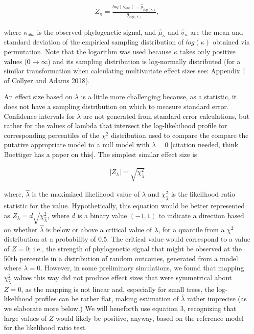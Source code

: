 \documentclass[
]{article}
\begin{document}
{\begin{align}
    Z_\kappa=\frac{log(\kappa_{obs})-\hat\mu_{log(\kappa)}}{\hat\sigma_{log(\kappa)}},
\end{align}

where \(\kappa_{obs}\) is the observed phylogenetic signal, and
\(\hat\mu_\kappa\) and \(\hat\sigma_\kappa\) are the mean and standard
deviation of the empirical sampling distribution of \(log(\kappa)\)
obtained via permutation. Note that the logarithm was used because
\(\kappa\) takes only positive values (\(0\to\infty\)) and its sampling
distribution is log-normally distributed (for a similar transformation
when calculating multivariate effect sizes see: Appendix 1 of Collyer
and Adams 2018). \hfill\break

An effect size based on \(\lambda\) is a little more challenging
because, as a statistic, it does not have a sampling distribution on
which to measure standard error. Confidence intervals for \(\lambda\)
are not generated from standard error calculations, but rather for the
values of lambda that intersect the log-likehihood profile for
corresponding percentiles of the \(\chi^2\) distribution used to compare
the compare the putative appropriate model to a null model with
\(\lambda = 0\) {[}citation needed, think Boettiger has a paper on
this{]}. The simplest similar effect size is

\begin{align}
   \lvert Z_{\lambda} \rvert = \sqrt{\chi^2_{\hat{\lambda}}}
\end{align}

where, \(\hat{\lambda}\) is the maximized likelihood value of
\(\lambda\) and \(\chi^{2}_{\hat{\lambda}}\) is the likelihood ratio
statistic for the value. Hypothetically, this equation would be better
represented as \(Z_{\lambda} = d \sqrt{\chi^2_{\hat{\lambda}}}\), where
\(d\) is a binary value \((-1,1)\) to indicate a direction based on
whether \(\hat{\lambda}\) is below or above a critical value of
\(\lambda\), for a quantile from a \(\chi^{2}\) distribution at a
probability of 0.5. The critical value would correspond to a value of
\(Z = 0\); i.e., the strength of phylogenetic signal that might be
observed at the 50th percentile in a distribution of random outcomes,
generated from a model where \(\lambda = 0\). However, in some
preliminary simulations, we found that mapping
\(\chi^2_{\hat{\lambda}}\) values this way did not produce effect sizes
that were symmetrical about \(Z = 0\), as the mapping is not linear and,
especially for small trees, the log-likelihood profiles can be rather
flat, making estimation of \(\hat{\lambda}\) rather imprecise (as we
elaborate more below.) We will heneforth use equation 3, recognizing
that large values of \(Z\) would likely be positive, anyway, based on
the reference model for the likelihood ratio test.

}
\end{document}
